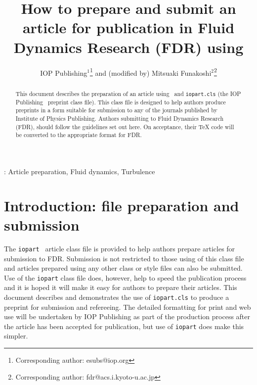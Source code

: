 \documentclass[12pt]{iopart}
\begin{document}
\title[]{How to prepare and submit an article for publication in Fluid Dynamics Research (FDR) using \LaTeXe}

\author{IOP Publishing$^1$\footnote{Corresponding 
author: esubs@iop.org} and (modified by) Mitsuaki 
Funakoshi$^2$\footnote{Corresponding author: fdr@acs.i.kyoto-u.ac.jp}}

\address{$^1$IOP Publishing, Dirac
House, Temple Back, Bristol BS1 6BE, UK}
\address{$^2$Graduate School of Informatics, Kyoto University,
Yoshida-Honmachi, Sakyo-ku, Kyoto, 606-8501, JAPAN}


\begin{abstract}
This document describes the  preparation of an article using \LaTeXe\ and 
\verb"iopart.cls" (the IOP Publishing \LaTeXe\ preprint class file).
This class file is designed to help 
authors produce preprints in a form suitable for submission to any of the
journals published by Institute of Physics Publishing.
Authors submitting to Fluid Dynamics Research (FDR),
should follow the guidelines set out here. 
On acceptance, their TeX code will be converted to 
the appropriate format for FDR.
\end{abstract}

\vspace{2pc}
: Article preparation, Fluid dynamics, Turbulence

\maketitle

\section{Introduction: file preparation and submission}
The \verb"iopart" \LaTeXe\ article class file is provided to help authors prepare articles for submission to FDR. Submission is not restricted to those using of this class file and articles prepared using any other class or style files can also be submitted. Use of the \verb"iopart" class file does, however, help to speed the publication process and it is hoped it will make it easy for authors to prepare their articles. This document describes and demonstrates the use of \verb"iopart.cls" to produce a preprint for submission and refereeing. The detailed formatting for print and web use will be undertaken by IOP Publishing as part of the production process after the article has been accepted for publication, but use of \verb"iopart" does make this simpler.
\end{document}
